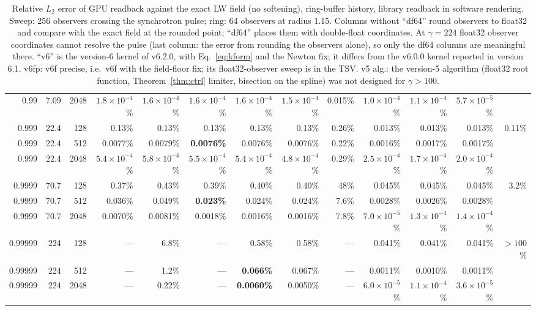 \documentclass[11pt, a4paper]{article}
\begin{document}
\begin{table}[htbp]
{\begin{tabular}{@{}rrrrrrrrrrrrr@{}}
0.99    & 7.09  & 2048 & $1.8\times10^{-4}$\% & $1.6\times10^{-4}$\% & $1.6\times10^{-4}$\% & $1.6\times10^{-4}$\% & $1.5\times10^{-4}$\% & 0.015\% & $1.0\times10^{-4}$\% & $1.1\times10^{-4}$\% & $5.7\times10^{-5}$\% &  \\
0.999   & 22.4  & 128  & 0.13\% & 0.13\% & 0.13\% & 0.13\% & 0.13\% & 0.26\% & 0.013\% & 0.013\% & 0.013\% & 0.11\% \\
0.999   & 22.4  & 512  & 0.0077\% & 0.0079\% & \textbf{0.0076\%} & 0.0076\% & 0.0076\% & 0.22\% & 0.0016\% & 0.0017\% & 0.0017\% &  \\
0.999   & 22.4  & 2048 & $5.4\times10^{-4}$\% & $5.8\times10^{-4}$\% & $5.5\times10^{-4}$\% & $5.4\times10^{-4}$\% & $4.8\times10^{-4}$\% & 0.29\% & $2.5\times10^{-4}$\% & $1.7\times10^{-4}$\% & $2.0\times10^{-4}$\% &  \\
0.9999  & 70.7  & 128  & 0.37\% & 0.43\% & 0.39\% & 0.40\% & 0.40\% & 48\% & 0.045\% & 0.045\% & 0.045\% & 3.2\% \\
0.9999  & 70.7  & 512  & 0.036\% & 0.049\% & \textbf{0.023\%} & 0.024\% & 0.024\% & 7.6\% & 0.0028\% & 0.0026\% & 0.0028\% &  \\
0.9999  & 70.7  & 2048 & 0.0070\% & 0.0081\% & 0.0018\% & 0.0016\% & 0.0016\% & 7.8\% & $7.0\times10^{-5}$\% & $1.3\times10^{-4}$\% & $1.4\times10^{-4}$\% &  \\
0.99999 & 224   & 128  & --- & 6.8\% & --- & 0.58\% & 0.58\% & --- & 0.041\% & 0.041\% & 0.041\% & $>100$\% \\
0.99999 & 224   & 512  & --- & 1.2\% & --- & \textbf{0.066\%} & 0.067\% & --- & 0.0011\% & 0.0010\% & 0.0011\% &  \\
0.99999 & 224   & 2048 & --- & 0.22\% & --- & \textbf{0.0060\%} & 0.0050\% & --- & $6.0\times10^{-5}$\% & $1.1\times10^{-4}$\% & $3.6\times10^{-5}$\% &  \\
\bottomrule
\end{tabular}}
\caption{Relative $L_2$ error of GPU readback against the exact LW field (no softening), ring-buffer history, library readback in software rendering. Sweep: 256 observers crossing the synchrotron pulse; ring: 64 observers at radius 1.15. Columns without ``df64'' round observers to float32 and compare with the exact field at the rounded point; ``df64'' places them with double-float coordinates. At $\gamma = 224$ float32 observer coordinates cannot resolve the pulse (last column: the error from rounding the observers alone), so only the df64 columns are meaningful there. ``v6'' is the version-6 kernel of v6.2.0, with Eq.~\eqref{eq:kform} and the Newton fix; it differs from the v6.0.0 kernel reported in version 6.1. v6fp: v6f precise, i.e.\ v6f with the field-floor fix; its float32-observer sweep is in the TSV. v5 alg.: the version-5 algorithm (float32 root function, Theorem~\ref{thm:ctrl} limiter, bisection on the spline) was not designed for $\gamma > 100$.}
\label{tab:gamma}
\end{table}
\end{document}
